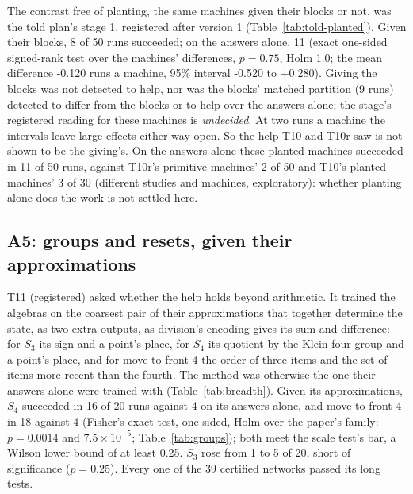 \documentclass[11pt]{article}
\newcommand{\pn}[2]{#2}
\begin{document}
The contrast free of planting, the same machines given their blocks or not, was the told plan's
stage 1, registered after version 1 (Table~\ref{tab:told-planted}). Given their blocks,
\pn{told1.planted-runs}{8} of 50 runs succeeded; on the answers alone, \pn{told1.alone-runs}{11}
(exact one-sided signed-rank test over the machines' differences, $p = \pn{told1.given-p}{0.75}$,
Holm \pn{told1.given-holm}{1.0}; the mean difference \pn{told1.given-mean}{-0.120} runs a machine, 95\%
interval \pn{told1.given-interval}{-0.520 to +0.280}). Giving the blocks was not detected to help,
nor was the blocks' matched partition (\pn{told1.matched-runs}{9} runs) detected to differ from the
blocks or to help over the answers alone; the stage's registered reading for these machines is
\emph{undecided}. At two runs a machine the intervals leave large effects either way open. So the help
T10 and T10r saw is not shown to be the giving's. On the answers alone these planted machines
succeeded in \pn{told1.alone-runs}{11} of 50 runs, against T10r's primitive machines' 2 of 50 and
T10's planted machines' 3 of 30 (different studies and machines, exploratory): whether planting
alone does the work is not settled here.

\subsection{A5: groups and resets, given their approximations}
\label{sec:a5}

T11 (registered) asked whether the help holds beyond arithmetic. It trained the algebras on the
coarsest pair of their approximations that together determine the state, as two extra outputs, as
division's encoding gives its sum and difference: for $S_3$ its sign and a point's place, for $S_4$
its quotient by the Klein four-group and a point's place, and for move-to-front-4 the order of three
items and the set of items more recent than the fourth. The method was otherwise the one their
answers alone were trained with (Table~\ref{tab:breadth}). Given its approximations, $S_4$ succeeded
in \pn{t11.s4}{16} of 20 runs against \pn{t11.s4-alone}{4} on its answers alone, and move-to-front-4
in \pn{t11.mtf4}{18} against \pn{t11.mtf4-alone}{4} (Fisher's exact test, one-sided, Holm over the
paper's family: $p = \pn{t11.s4-holm}{0.0014}$ and $\pn{t11.mtf4-holm}{7.5 \times 10^{-5}}$;
Table~\ref{tab:groups}); both meet the scale test's bar, a Wilson lower bound of at least 0.25. $S_3$
rose from \pn{t11.s3-alone}{1} to \pn{t11.s3}{5} of 20, short of significance ($p =
\pn{t11.s3-holm}{0.25}$). Every one of the \pn{t11.networks}{39} certified networks passed its long
tests.
\end{document}
